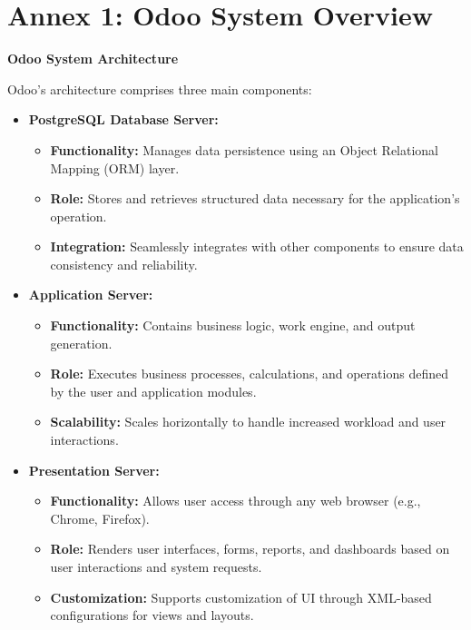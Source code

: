 \thispagestyle{empty} 
\chapter*{\centering Annex 1: Odoo System Overview}
\thispagestyle{empty} 
\textbf{Odoo System Architecture}

Odoo's architecture comprises three main components:

\begin{itemize}
\item \textbf{PostgreSQL Database Server:}
  \begin{itemize}
  \item \textbf{Functionality:} Manages data persistence using an Object Relational Mapping (ORM) layer.
  \item \textbf{Role:} Stores and retrieves structured data necessary for the application's operation.
  \item \textbf{Integration:} Seamlessly integrates with other components to ensure data consistency and reliability.
  \end{itemize}
  
\item \textbf{Application Server:}
  \begin{itemize}
  \item \textbf{Functionality:} Contains business logic, work engine, and output generation.
  \item \textbf{Role:} Executes business processes, calculations, and operations defined by the user and application modules.
  \item \textbf{Scalability:} Scales horizontally to handle increased workload and user interactions.
  \end{itemize}
  
\item \textbf{Presentation Server:}
  \begin{itemize}
  \item \textbf{Functionality:} Allows user access through any web browser (e.g., Chrome, Firefox).
  \item \textbf{Role:} Renders user interfaces, forms, reports, and dashboards based on user interactions and system requests.
  \item \textbf{Customization:} Supports customization of UI through XML-based configurations for views and layouts.
  \end{itemize}
\end{itemize}

